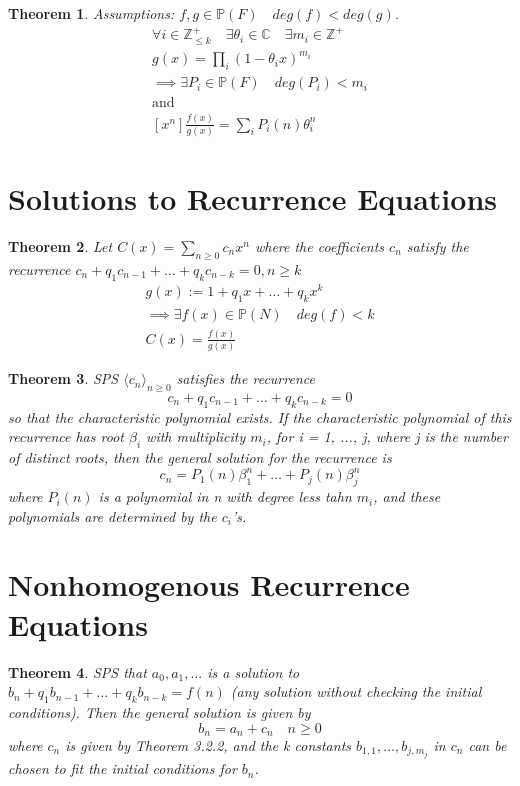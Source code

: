 \documentclass[11pt, oneside]{book}
\theoremstyle{break}
\newtheorem{thm}{Theorem}[section]
\newcommand{\bb}[1]{\mathbb{#1}}		%
\begin{document}
\begin{thm}
	Assumptions: $f, g \in \bb{P}(F) \quad deg(f) < deg(g)$. \\
	\begin{gather*}
		\forall i \in \bb{Z}_{\leq k}^+ \quad \exists \theta_i \in \bb{C} \quad \exists m_i \in \bb{Z}^+ \\
		g(x) = \prod_{i} (1 - \theta_i x)^{m_i} \\
		\implies \exists P_i \in \bb{P}(F) \quad deg(P_i) < m_i \\
		\text{and} \\
		[x^n]\frac{f(x)}{g(x)} = \sum_{i}P_i(n) \theta_i^n
	\end{gather*}
\end{thm}

\section{Solutions to Recurrence Equations}
\begin{thm}
	Let $C(x) = \sum_{n \geq 0} c_nx^n$ where the coefficients $c_n$ satisfy the recurrence $c_n + q_1c_{n-1} + \hdots + q_kc_{n-k} = 0, n \geq k$
	\begin{gather*}
		g(x) := 1 + q_1x + \hdots + q_kx^k \\
		\implies \exists f(x) \in \bb{P}(N) \quad deg(f) < k \\
		C(x) = \frac{f(x)}{g(x)}
	\end{gather*}
\end{thm}

\begin{thm}
	SPS $\langle c_n \rangle _{n \geq 0}$ satisfies the recurrence
	\[
		c_n + q_1c_{n-1} + \hdots + q_kc_{n-k} = 0
	\]
	so that the characteristic polynomial exists. If the characteristic polynomial of this recurrence has root $\beta_i$ with multiplicity $m_i$, for i = 1, ..., j, where j is the number of distinct roots, then the general solution for the recurrence is
	\[
		c_n = P_1(n)\beta_1^n + \hdots + P_j(n)\beta_j^n
	\]
	where $P_i(n)$ is a polynomial in n with degree less tahn $m_i$, and these polynomials are determined by the $c_i$'s.
\end{thm}


\section{Nonhomogenous Recurrence Equations}

\begin{thm}
	SPS that $a_0, a_1, ...$ is a solution to $b_n + q_1b_{n-1} + \hdots + q_kb_{n-k} = f(n)$ (any solution without checking the initial conditions). Then the general solution is given by
	\[
		b_n = a_n + c_n \quad n \geq 0
	\]
	where $c_n$ is given by Theorem 3.2.2, and the k constants $b_{1,1}, ..., b_{j,m_j}$ in $c_n$ can be chosen to fit the initial conditions for $b_n$.
\end{thm}
\end{document}
